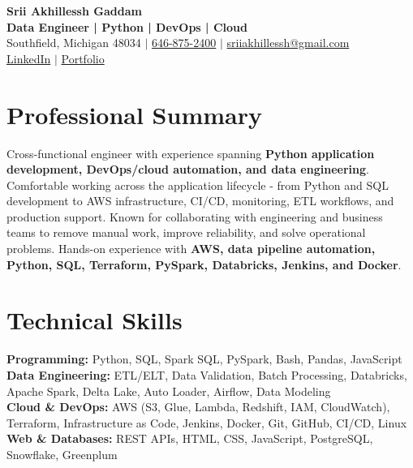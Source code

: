 \documentclass[letterpaper,10pt]{article}
\begin{document}
\fontsize{9.35pt}{10.45pt}\selectfont

\begin{center}
    {\LARGE \textbf{Srii Akhillessh Gaddam}} \\[-1pt]
    \textbf{Data Engineer | Python | DevOps | Cloud} \\[2pt]
    Southfield, Michigan 48034 $|$
    \href{tel:6468752400}{646-875-2400} $|$
    \href{mailto:sriiakhillessh@gmail.com}{sriiakhillessh@gmail.com} \\[1pt]
    \href{https://www.linkedin.com/in/srii-akhiilessh-gaddam-b48668191/}{LinkedIn} $|$
    \href{https://sriiakhillesshg.github.io/portfolio/}{Portfolio}
\end{center}
\vspace{-8pt}

\section{Professional Summary}
\small{Cross-functional engineer with experience spanning \textbf{Python application development, DevOps/cloud automation, and data engineering}. Comfortable working across the application lifecycle - from Python and SQL development to AWS infrastructure, CI/CD, monitoring, ETL workflows, and production support. Known for collaborating with engineering and business teams to remove manual work, improve reliability, and solve operational problems. Hands-on experience with \textbf{AWS, data pipeline automation, Python, SQL, Terraform, PySpark, Databricks, Jenkins, and Docker}.}

\section{Technical Skills}
\small{
\textbf{Programming:} Python, SQL, Spark SQL, PySpark, Bash, Pandas, JavaScript \\
\textbf{Data Engineering:} ETL/ELT, Data Validation, Batch Processing, Databricks, Apache Spark, Delta Lake, Auto Loader, Airflow, Data Modeling \\
\textbf{Cloud \& DevOps:} AWS (S3, Glue, Lambda, Redshift, IAM, CloudWatch), Terraform, Infrastructure as Code, Jenkins, Docker, Git, GitHub, CI/CD, Linux \\
\textbf{Web \& Databases:} REST APIs, HTML, CSS, JavaScript, PostgreSQL, Snowflake, Greenplum
}
\end{document}
